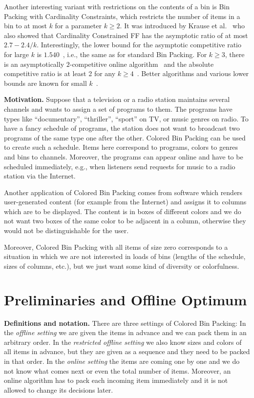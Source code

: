 \documentclass[11pt,a4paper]{article}
\begin{document}
Another interesting variant with restrictions on the contents of a bin
is Bin Packing with Cardinality Constraints, which restricts
the number of items in a bin to at most $k$ for a parameter $k \geq
2$. It was introduced by Krause et al.~\cite{krause75} who also showed
that Cardinality Constrained FF has the asymptotic ratio of at most
$2.7-2.4/k$. Interestingly, the lower bound for the asymptotic
competitive ratio for large $k$ is $1.540$~\cite{balogh12}, i.e., the
same as for standard Bin Packing. For $k\geq 3$, there is an
asymptotically $2$-competitive online algorithm~\cite{babel04} and the
absolute competitive ratio is at least 2 for any $k\geq
4$~\cite{dosa14bpcc}.  Better algorithms and various lower bounds are
known for small $k$~\cite{epstein06,babel04}.

\medskip

\textbf{Motivation.}
Suppose that a television or a radio station maintains several
channels and wants to assign a set of programs to them. The programs
have types like ``documentary'', ``thriller'', ``sport'' on TV,
or music genres on radio. To have a fancy schedule
of programs, the station does not want to broadcast two programs of the
same type one after the other. Colored Bin Packing can be used to
create such a schedule. Items here correspond to programs, colors to
genres and bins to channels.  Moreover, the programs can appear online
and have to be scheduled immediately, e.g., when listeners send
requests for music to a radio station via the Internet.

Another application of Colored Bin Packing comes from software which
renders user-generated content (for example from the
Internet) and assigns it to columns which are to be displayed.
The content is in boxes of different colors and we do not want
two boxes of the same color to be adjacent in a column,
otherwise they would not be distinguishable for the user.

Moreover, Colored Bin Packing with all items of size zero corresponds
to a situation in which we are not interested in loads of bins
(lengths of the schedule, sizes of columns, etc.), but we just want
some kind of diversity or colorfulness.

\section{Preliminaries and Offline Optimum}\label{sec:Prelim}

\textbf{Definitions and notation.}
There are three settings of Colored Bin Packing:
In the \textit{offline setting} we are given the items in advance
and we can pack them in an arbitrary order.
In the \textit{restricted offline setting} we also know sizes and colors of all items in advance,
but they are given as a sequence and they need to be packed in that order.
In the \textit{online setting} the items are coming one by one and we do not
know what comes next or even the total number of items. 
Moreover, an online algorithm has to pack each incoming item immediately
and it is not allowed to change its decisions later.
\end{document}
